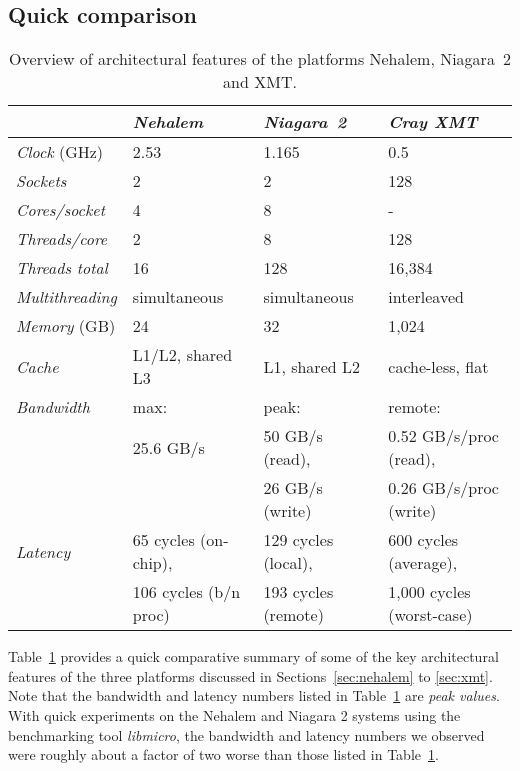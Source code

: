 \documentclass{article}
\begin{document}
\subsection{Quick comparison}
\label{sec:comparison}

\begin{table}
{\footnotesize
\centering
\begin{tabular}{l|l|l|l}
\hline \hline
      & {\em Nehalem} & {\em Niagara~2} & {\em Cray XMT} \\    
 \hline \hline        
{\em Clock} (GHz) & 2.53 & 1.165 & 0.5 \\ \hline
{\em Sockets} & 2 & 2 & 128 \\
{\em Cores/socket} & 4 & 8 & -  \\
{\em Threads/core} & 2 & 8 & 128 \\
{\em Threads total} & 16 & 128 & 16,384 \\ \hline
{\em Multithreading} & simultaneous & simultaneous & interleaved \\ \hline
{\em Memory} (GB) & 24 & 32 & 1,024 \\ \hline
{\em Cache} & L1/L2, shared L3 & L1, shared L2 & cache-less, flat \\ \hline
{\em Bandwidth} & max: & peak: &
remote:  \\
& 25.6 GB/s & 50 GB/s (read), & 0.52 GB/s/proc (read),  \\
& & 26 GB/s (write) & 
0.26 GB/s/proc (write) \\ \hline
{\em Latency} &  65 cycles (on-chip), & 129 cycles (local), &
600 cycles (average), \\
&  106 cycles (b/n proc) & 193 cycles (remote) & 1,000 cycles (worst-case) \\
\hline \hline
\end{tabular}

\caption{Overview of architectural features of the platforms Nehalem, Niagara~2 and XMT.}
\label{t:arch-overview}
}
\end{table}   

Table~\ref{t:arch-overview} provides a quick comparative summary of some of the key architectural 
features of the three platforms discussed in Sections~\ref{sec:nehalem} to \ref{sec:xmt}.
Note that the bandwidth and latency numbers listed in Table~\ref{t:arch-overview} are {\em peak values}.
With quick experiments on the Nehalem and Niagara 2 systems using the benchmarking tool
{\em libmicro}, the bandwidth and latency numbers we observed were roughly about a factor
of two worse than those listed in Table~\ref{t:arch-overview}.
\end{document}
